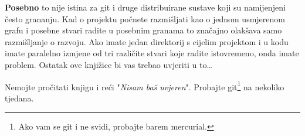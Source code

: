 \textbf{Posebno} to nije istina za git i druge distribuirane sustave koji su namijenjeni često grananju.
Kad o projektu počnete razmišljati kao o jednom usmjerenom grafu i posebne stvari radite u posebnim granama to značajno olakšava samo razmišljanje o razvoju.
Ako imate jedan direktorij s cijelim projektom i u kodu imate paralelno izmjene od tri različite stvari koje radite istovremeno, onda imate problem.
Ostatak ove knjižice bi vas trebao uvjeriti u to\dots

Nemojte pročitati knjigu i reći "\emph{Nisam baš uvjeren}". 
Probajte git\footnote{Ako vam se git i ne svidi, probajte barem mercurial.} na nekoliko tjedana.

